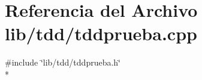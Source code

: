 \section{Referencia del Archivo lib/tdd/tddprueba.cpp}
\label{tddprueba_8cpp}
{\ttfamily \#include \char`\"{}lib/tdd/tddprueba.\+h\char`\"{}}\\*
